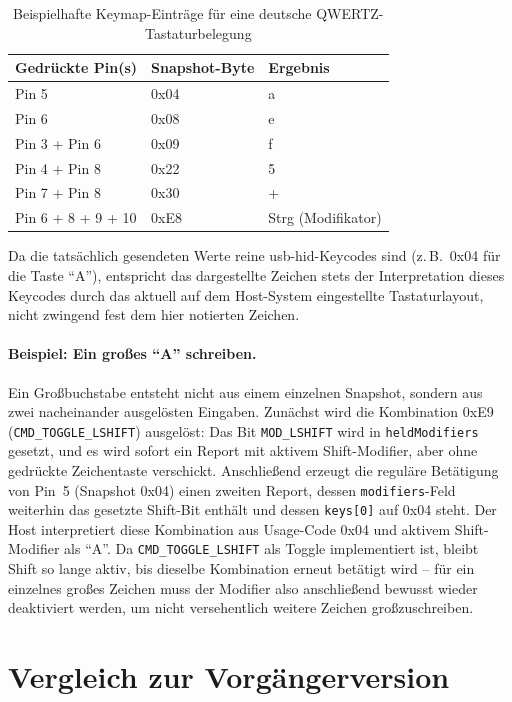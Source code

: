 \documentclass{article}
\begin{document}
\begin{table}[ht]
\centering
\begin{tabular}{lll}
\toprule
\textbf{Gedrückte Pin(s)} & \textbf{Snapshot-Byte} & \textbf{Ergebnis} \\
\midrule
Pin 5 & 0x04 & a \\
Pin 6 & 0x08 & e \\
Pin 3 + Pin 6 & 0x09 & f \\
Pin 4 + Pin 8 & 0x22 & 5 \\
Pin 7 + Pin 8 & 0x30 & + \\
Pin 6 + 8 + 9 + 10 & 0xE8 & Strg (Modifikator) \\
\bottomrule
\end{tabular}
\caption{Beispielhafte Keymap-Einträge für eine deutsche QWERTZ-Tastaturbelegung}
\label{tab:keymap}
\end{table}
\FloatBarrier

Da die tatsächlich gesendeten Werte reine \gls{usb-hid}-Keycodes sind (z.\,B.\ 0x04 für die Taste \enquote{A}), entspricht das dargestellte Zeichen stets der Interpretation dieses Keycodes durch das aktuell auf dem Host-System eingestellte Tastaturlayout, nicht zwingend fest dem hier notierten Zeichen.
\paragraph{Beispiel: Ein großes \enquote{A} schreiben.}
Ein Großbuchstabe entsteht nicht aus einem einzelnen Snapshot, sondern aus zwei nacheinander ausgelösten Eingaben. Zunächst wird die Kombination 0xE9 (\texttt{CMD\_TOGGLE\_LSHIFT}) ausgelöst: Das Bit \texttt{MOD\_LSHIFT} wird in \texttt{heldModifiers} gesetzt, und es wird sofort ein Report mit aktivem Shift-Modifier, aber ohne gedrückte Zeichentaste verschickt. Anschließend erzeugt die reguläre Betätigung von Pin~5 (Snapshot 0x04) einen zweiten Report, dessen \texttt{modifiers}-Feld weiterhin das gesetzte Shift-Bit enthält und dessen \texttt{keys[0]} auf 0x04 steht. Der Host interpretiert diese Kombination aus Usage-Code 0x04 und aktivem Shift-Modifier als \enquote{A}. Da \texttt{CMD\_TOGGLE\_LSHIFT} als Toggle implementiert ist, bleibt Shift so lange aktiv, bis dieselbe Kombination erneut betätigt wird -- für ein einzelnes großes Zeichen muss der Modifier also anschließend bewusst wieder deaktiviert werden, um nicht versehentlich weitere Zeichen großzuschreiben.

\section{Vergleich zur Vorgängerversion}
\label{sec:vergleich}
\end{document}
